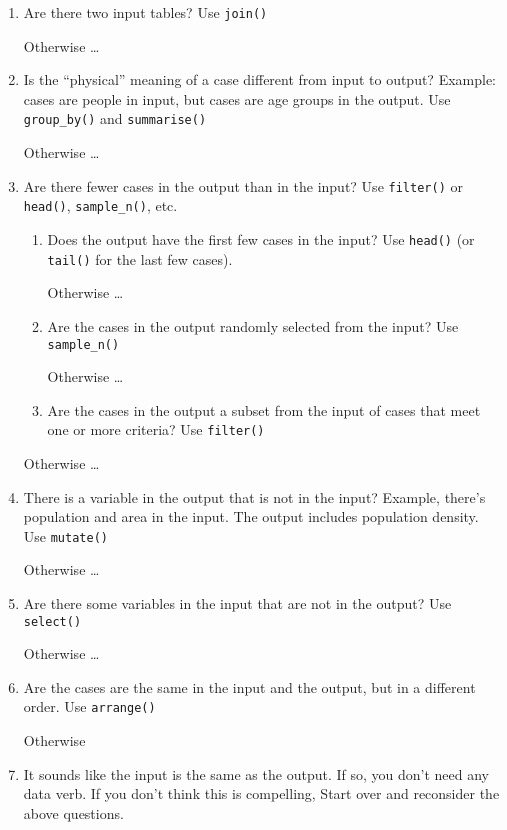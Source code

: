 \documentclass[]{article}
\begin{document}
\begin{enumerate}
\def\labelenumi{\arabic{enumi}.}
\item
  Are there two input tables? Use \texttt{join()}

  Otherwise \ldots{}
\item
  Is the ``physical'' meaning of a case different from input to output?
  Example: cases are people in input, but cases are age groups in the
  output. Use \texttt{group\_by()} and \texttt{summarise()}

  Otherwise \ldots{}
\item
  Are there fewer cases in the output than in the input? Use
  \texttt{filter()} or \texttt{head()}, \texttt{sample\_n()}, etc.

  \begin{enumerate}
  \def\labelenumii{\arabic{enumii}.}
  \item
    Does the output have the first few cases in the input? Use
    \texttt{head()} (or \texttt{tail()} for the last few cases).

    Otherwise \ldots{}
  \item
    Are the cases in the output randomly selected from the input? Use
    \texttt{sample\_n()}

    Otherwise \ldots{}
  \item
    Are the cases in the output a subset from the input of cases that
    meet one or more criteria? Use \texttt{filter()}
  \end{enumerate}

  Otherwise \ldots{}
\item
  There is a variable in the output that is not in the input? Example,
  there's population and area in the input. The output includes
  population density. Use \texttt{mutate()}

  Otherwise \ldots{}
\item
  Are there some variables in the input that are not in the output? Use
  \texttt{select()}

  Otherwise \ldots{}
\item
  Are the cases are the same in the input and the output, but in a
  different order. Use \texttt{arrange()}

  Otherwise
\item
  It sounds like the input is the same as the output. If so, you don't
  need any data verb. If you don't think this is compelling, Start over
  and reconsider the above questions.
\end{enumerate}
\end{document}

